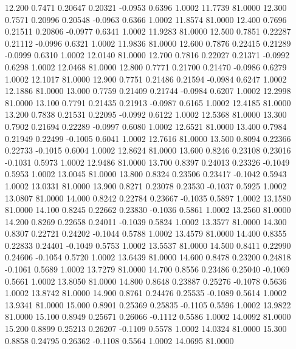   12.200   0.7471   0.20647   0.20321  -0.0953   0.6396   1.0002  11.7739  81.0000
  12.300   0.7571   0.20996   0.20548  -0.0963   0.6366   1.0002  11.8574  81.0000
  12.400   0.7696   0.21511   0.20806  -0.0977   0.6341   1.0002  11.9283  81.0000
  12.500   0.7851   0.22287   0.21112  -0.0996   0.6321   1.0002  11.9836  81.0000
  12.600   0.7876   0.22415   0.21289  -0.0999   0.6310   1.0002  12.0140  81.0000
  12.700   0.7816   0.22027   0.21371  -0.0992   0.6298   1.0002  12.0468  81.0000
  12.800   0.7771   0.21700   0.21470  -0.0986   0.6279   1.0002  12.1017  81.0000
  12.900   0.7751   0.21486   0.21594  -0.0984   0.6247   1.0002  12.1886  81.0000
  13.000   0.7759   0.21409   0.21744  -0.0984   0.6207   1.0002  12.2998  81.0000
  13.100   0.7791   0.21435   0.21913  -0.0987   0.6165   1.0002  12.4185  81.0000
  13.200   0.7838   0.21531   0.22095  -0.0992   0.6122   1.0002  12.5368  81.0000
  13.300   0.7902   0.21694   0.22289  -0.0997   0.6080   1.0002  12.6521  81.0000
  13.400   0.7984   0.21949   0.22499  -0.1005   0.6041   1.0002  12.7616  81.0000
  13.500   0.8094   0.22366   0.22733  -0.1015   0.6004   1.0002  12.8624  81.0000
  13.600   0.8246   0.23108   0.23016  -0.1031   0.5973   1.0002  12.9486  81.0000
  13.700   0.8397   0.24013   0.23326  -0.1049   0.5953   1.0002  13.0045  81.0000
  13.800   0.8324   0.23506   0.23417  -0.1042   0.5943   1.0002  13.0331  81.0000
  13.900   0.8271   0.23078   0.23530  -0.1037   0.5925   1.0002  13.0807  81.0000
  14.000   0.8242   0.22784   0.23667  -0.1035   0.5897   1.0002  13.1580  81.0000
  14.100   0.8245   0.22662   0.23830  -0.1036   0.5861   1.0002  13.2560  81.0000
  14.200   0.8269   0.22658   0.24011  -0.1039   0.5824   1.0002  13.3577  81.0000
  14.300   0.8307   0.22721   0.24202  -0.1044   0.5788   1.0002  13.4579  81.0000
  14.400   0.8355   0.22833   0.24401  -0.1049   0.5753   1.0002  13.5537  81.0000
  14.500   0.8411   0.22990   0.24606  -0.1054   0.5720   1.0002  13.6439  81.0000
  14.600   0.8478   0.23200   0.24818  -0.1061   0.5689   1.0002  13.7279  81.0000
  14.700   0.8556   0.23486   0.25040  -0.1069   0.5661   1.0002  13.8050  81.0000
  14.800   0.8648   0.23887   0.25276  -0.1078   0.5636   1.0002  13.8742  81.0000
  14.900   0.8761   0.24476   0.25535  -0.1089   0.5614   1.0002  13.9341  81.0000
  15.000   0.8901   0.25369   0.25835  -0.1105   0.5596   1.0002  13.9822  81.0000
  15.100   0.8949   0.25671   0.26066  -0.1112   0.5586   1.0002  14.0092  81.0000
  15.200   0.8899   0.25213   0.26207  -0.1109   0.5578   1.0002  14.0324  81.0000
  15.300   0.8858   0.24795   0.26362  -0.1108   0.5564   1.0002  14.0695  81.0000
